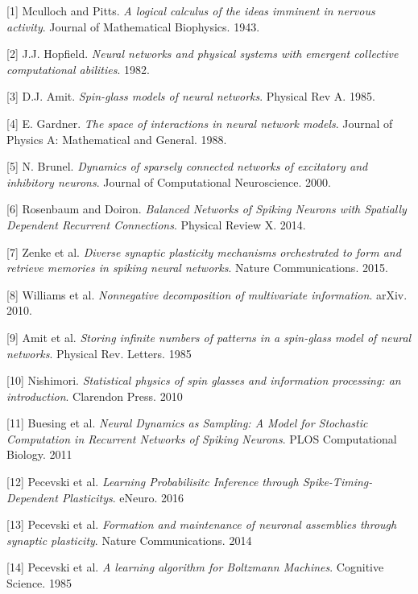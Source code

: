 \documentclass{ucetd}
\begin{document}

\makebibliography

[1] Mculloch and Pitts. \textit{A logical calculus of the ideas imminent in nervous activity}. Journal of Mathematical Biophysics. 1943.

[2] J.J. Hopfield. \textit{Neural networks and physical systems with emergent collective computational abilities}. 1982.

[3] D.J. Amit. \textit{Spin-glass models of neural networks}. Physical Rev A. 1985.

[4] E. Gardner. \textit{The space of interactions in neural network models}. Journal of Physics A: Mathematical and General. 1988.

[5] N. Brunel. \textit{Dynamics of sparsely connected networks of excitatory and inhibitory neurons}. Journal of Computational Neuroscience. 2000. 

[6] Rosenbaum and Doiron. \textit{Balanced Networks of Spiking Neurons with Spatially Dependent Recurrent Connections}. Physical Review X. 2014.

[7] Zenke et al. \textit{Diverse synaptic plasticity mechanisms
orchestrated to form and retrieve memories
in spiking neural networks}. Nature Communications. 2015.

[8] Williams et al. \textit{Nonnegative decomposition of multivariate information}. arXiv. 2010.

[9] Amit et al. \textit{Storing infinite numbers of patterns in a spin-glass model of neural networks}. Physical Rev. Letters. 1985

[10] Nishimori. \textit{Statistical physics of spin glasses and information processing: an introduction}. Clarendon Press. 2010

[11] Buesing et al. \textit{Neural Dynamics as Sampling: A Model for Stochastic Computation in Recurrent Networks of Spiking Neurons}. PLOS Computational Biology. 2011

[12] Pecevski et al. \textit{Learning Probabilisitc Inference through Spike-Timing-Dependent Plasticitys}. eNeuro. 2016

[13] Pecevski et al. \textit{Formation and maintenance of neuronal assemblies through synaptic plasticity}. Nature Communications. 2014

[14] Pecevski et al. \textit{A learning algorithm for Boltzmann Machines}. Cognitive Science. 1985

%
%
\end{document}
